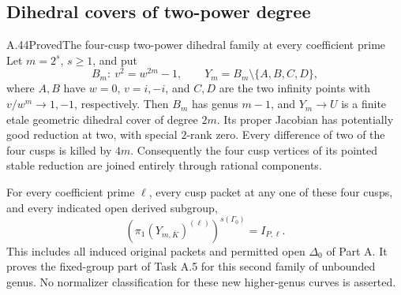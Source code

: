 \subsection{Dihedral covers of two-power degree}

\begin{statement}{A.44}{Proved}{The four-cusp two-power dihedral family at every coefficient prime}
Let \(m=2^s\), \(s\ge1\), and put
\[
 B_m:\ v^2=w^{2m}-1,
 \qquad Y_m=B_m\setminus\{A,B,C,D\},               \tag{A.44.1}
\]
where \(A,B\) have \(w=0\), \(v=i,-i\), and
\(C,D\) are the two infinity points with
\(v/w^m\to1,-1\), respectively. Then \(B_m\)
has genus \(m-1\), and \(Y_m\to U\) is a finite
etale geometric dihedral cover of degree \(2m\).
Its proper Jacobian has potentially good reduction at
two, with special \(2\)-rank zero. Every difference
of two of the four cusps is killed by \(4m\).
Consequently the four cusp vertices of its pointed
stable reduction are joined entirely through rational
components.

For every coefficient prime \(\ell\), every cusp
packet at any one of these four cusps, and every
indicated open derived subgroup,
\[
                   \left(\pi_1(Y_{m,\bar K})^{(\ell)}\right)^{s(\Gamma_0)}
                                      =I_{P,\ell}.   \tag{A.44.2}
\]
This includes all induced original packets and permitted
open \(\Delta_0\) of Part A. It proves the fixed-group
part of Task A.5 for this second family of unbounded
genus. No normalizer classification for these new
higher-genus curves is asserted.
\end{statement}


